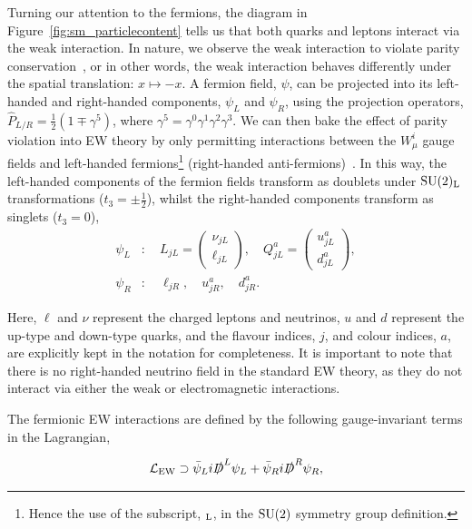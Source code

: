 Turning our attention to the fermions, the diagram in Figure~\ref{fig:sm_particlecontent} tells us that both quarks and leptons interact via the weak interaction. In nature, we observe the weak interaction to violate parity conservation~\cite{PhysRev.105.1413}, or in other words, the weak interaction behaves differently under the spatial translation: $x\mapsto-x$. A fermion field, $\psi$, can be projected into its left-handed and right-handed components, $\psi_L$ and $\psi_R$, using the projection operators, $\hat{P}_{L/R} = \frac{1}{2}(1\mp\gamma^5)$, where $\gamma^5=\gamma^0\gamma^1\gamma^2\gamma^3$. We can then bake the effect of parity violation into EW theory by only permitting interactions between the $W^i_\mu$ gauge fields and left-handed fermions\footnote{Hence the use of the subscript, ${}_{\rm{L}}$, in the ${\rm{SU}}(2)$ symmetry group definition.} (right-handed anti-fermions)~\cite{Aitchison:2004cs}. In this way, the left-handed components of the fermion fields transform as doublets under ${\rm{SU}}(2)_{\rm{L}}$ transformations ($t_3=\pm\frac{1}{2}$), whilst the right-handed components transform as singlets ($t_3=0$),
\begin{equation}
\begin{split}
    \psi_L&: \quad L_{jL} = \begin{pmatrix}
    \nu_{jL} \\
    \ell_{jL}
    \end{pmatrix}, \quad Q^a_{jL} = \begin{pmatrix}
    u^a_{jL} \\
    d^a_{jL}
    \end{pmatrix},
    \\
    \psi_R&: \quad \ell_{jR}, \quad u^a_{jR}, \quad d^a_{jR}.
\end{split}
\end{equation}

\noindent
Here, $\ell$ and $\nu$ represent the charged leptons and neutrinos, $u$ and $d$ represent the up-type and down-type quarks, and the flavour indices, $j$, and colour indices, $a$, are explicitly kept in the notation for completeness. It is important to note that there is no right-handed neutrino field in the standard EW theory, as they do not interact via either the weak or electromagnetic interactions.

The fermionic EW interactions are defined by the following gauge-invariant terms in the Lagrangian,

\begin{equation}\label{eq:ew_interactionterms}
    \mathcal{L}_{\rm{EW}} \supset \bar{\psi}_L i \slashed{D}^L \psi_L + \bar{\psi}_R i \slashed{D}^R \psi_R,
\end{equation}

